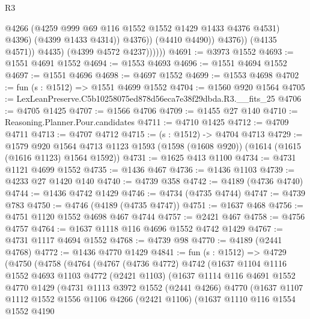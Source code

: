 \begin{lexlean}{R3}
\begin{coremodule}
                                @4266
                                (@4259 @999 @69 @116 @1552 @1552 @1429 @1433 @4376 @4531)
                                @4396)
                              (@4399 @1433 @4314))
                            @4376))
                        (@4410 @4490))
                      @4376))
                  (@4135 @4571))
                @4435)
              (@4399 @4572 @4237))))))
@4691 := @3973 @1552
@4693 := @1551 @4691 @1552
@4694 := @1553 @4693
@4696 := @1551 @4694 @1552
@4697 := @1551 @4696
@4698 := @4697 @1552
@4699 := @1553 @4698
@4702 := fun (s : @1512) => @1551 @4699 @1552
@4704 := @1560 @920 @1564
@4705 := LexLeanPreserve.C5b10258075ed878d56eca7e38f29dbda.R3.__fits_25
@4706 := @4705 @1425
@4707 := @1566 @4706
@4709 := @1455 @27 @140
@4710 := Reasoning.Planner.Pour.candidates
@4711 := @4710 @1425
@4712 := @4709 @4711
@4713 := @4707 @4712
@4715 := (s : @1512) -> @4704 @4713
@4729 := @1579
    @920
    @1564
    @4713
    @1123
    @1593
    (@1598 (@1608 @920))
    (@1614 (@1615 (@1616 @1123) @1564 @1592))
@4731 := @1625 @413 @1100
@4734 := @4731 @1121 @4699 @1552
@4735 := @1436 @467
@4736 := @1436 @1103
@4739 := @4233 @27 @1420 @140
@4740 := @4739 @358
@4742 := @4189 (@4736 @4740)
@4744 := @1436 @4742 @1429
@4746 := @4734 (@4735 @4744)
@4747 := @4739 @783
@4750 := @4746 (@4189 (@4735 @4747))
@4751 := @1637 @468
@4756 := @4751 @1120 @1552 @4698 @467 @4744
@4757 := @2421 @467
@4758 := @4756 @4757
@4764 := @1637 @1118 @116 @4696 @1552 @4742 @1429
@4767 := @4731 @1117 @4694 @1552
@4768 := @4739 @98
@4770 := @4189 (@2441 @4768)
@4772 := @1436 @4770 @1429
@4841 := fun (s : @1512) =>
  @4729
    (@4750
      (@4758
        (@4764
          (@4767
            (@4736 @4772)
            @4742
            (@1637
              @1104
              @1116
              @1552
              @4693
              @1103
              @4772
              (@2421 @1103)
              (@1637
                @1114
                @116
                @4691
                @1552
                @4770
                @1429
                (@4731
                  @1113
                  @3972
                  @1552
                  (@2441 @4266)
                  @4770
                  (@1637
                    @1107
                    @1112
                    @1552
                    @1556
                    @1106
                    @4266
                    (@2421 @1106)
                    (@1637
                      @1110
                      @116
                      @1554
                      @1552
                      @4190

\end{coremodule}
\end{lexlean}
